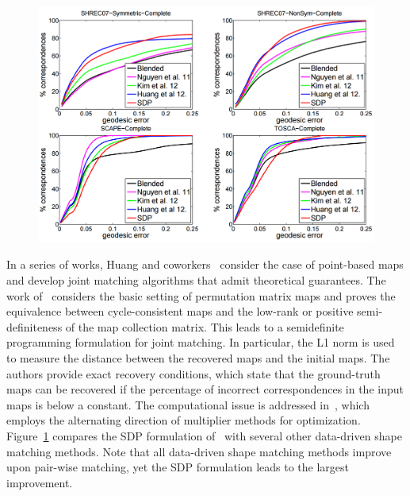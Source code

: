 \begin{figure}[t!]
\centering
    \includegraphics[width=1.0\columnwidth]{fig/img/map_evaluation.png}
    \vspace{-.5cm}
    \caption{}
    \label{fig:map_evaluation}
\end{figure}

 In a series of works, Huang and coworkers~\cite{Huang:2013:SDP,Chen:2014:SDP,cg-ssrmrf-14} consider the case of point-based maps and develop joint matching algorithms that admit theoretical guarantees. The work of~\cite{Huang:2013:SDP} considers the basic setting of permutation matrix maps and proves the equivalence between cycle-consistent maps and the low-rank or positive semi-definiteness of the map collection matrix. This leads to a semidefinite programming formulation for joint matching. In particular, the L1 norm is used to measure the distance between the recovered maps and the initial maps. The authors provide exact recovery conditions, which state that the ground-truth maps can be recovered if the percentage of incorrect correspondences in the input maps is below a constant.  The computational issue is addressed in~\cite{cg-ssrmrf-14}, which employs the alternating direction of multiplier methods for optimization. Figure~\ref{fig:map_evaluation} compares the SDP formulation of~\cite{Huang:2013:SDP} with several other data-driven shape matching methods. Note that all data-driven shape matching methods improve upon pair-wise matching, yet the SDP formulation leads to the largest improvement.

